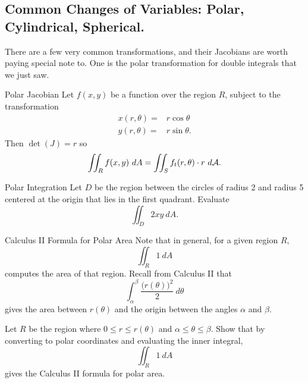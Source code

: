\subsection{Common Changes of Variables: Polar, Cylindrical, Spherical.}

There are a few very common transformations, and their Jacobians are worth paying special note to. One is the polar transformation for double integrals that we just saw.

\begin{claim}{Polar Jacobian}
Let $f(x,y)$ be a function over the region $R$, subject to the transformation
\begin{align*}
x(r,\theta)=&r\cos\theta\\
y(r,\theta)=&r\sin\theta.
\end{align*}
Then $\det(J)=r$ so $$\iint_R f(x,y)\ dA=\iint_S f_t(r,\theta)\cdot r\ d\mathcal{A}.$$
\end{claim}

\begin{exercise}{Polar Integration}
Let $D$ be the region between the circles of radius 2 and radius 5 centered at the origin that lies in the first quadrant. Evaluate $$\iint_D 2xy\ dA. $$
\end{exercise}

\begin{exercise}{Calculus II Formula for Polar Area}
Note that in general, for a given region $R$, $$\iint_R 1\ dA $$ computes the area of that region. Recall from Calculus II that $$\int_{\alpha}^{\beta}\frac{\big(r(\theta)\big)^2}{2}\ d\theta $$ gives the area between $r(\theta)$ and the origin between the angles $\alpha$ and $\beta$. 

\vspace{1em}

Let $R$ be the region where $0\leq r\leq r(\theta)$ and $\alpha \leq \theta\leq \beta$. Show that by converting to polar coordinates and evaluating the inner integral, $$\iint_R 1\ dA$$ gives the Calculus II formula for polar area.
\end{exercise}

